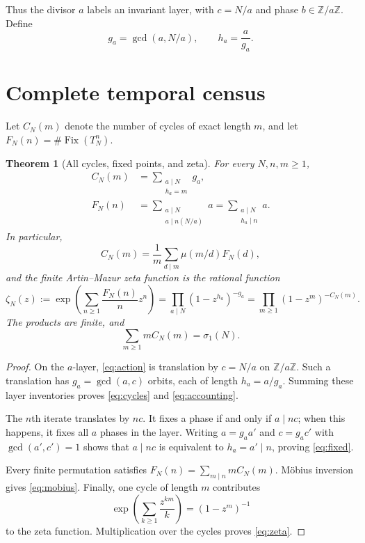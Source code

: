 \documentclass[11pt,a4paper]{amsart}
\newcommand{\Z}{\mathbb Z}
\newcommand{\Fix}{\operatorname{Fix}}
\newtheorem{theorem}{Theorem}[section]
\begin{document}
Thus the divisor $a$ labels an invariant layer, with $c=N/a$ and phase
$b\in\Z/a\Z$.  Define
\begin{equation}
 \label{eq:gh}
 g_a=\gcd(a,N/a),\qquad h_a=\frac{a}{g_a}.
\end{equation}

\section{Complete temporal census}

Let $C_N(m)$ denote the number of cycles of exact length $m$, and let
$F_N(n)=\#\Fix(T_N^n)$.

\begin{theorem}[All cycles, fixed points, and zeta]
\label{thm:census}
For every $N,n,m\geq1$,
\begin{align}
 C_N(m)
   &=\sum_{\substack{a\mid N\\h_a=m}}g_a,                                      \label{eq:cycles}\\
 F_N(n)
   &=\sum_{\substack{a\mid N\\a\mid n(N/a)}}a
     =\sum_{\substack{a\mid N\\h_a\mid n}}a.                                \label{eq:fixed}
\end{align}
In particular,
\begin{equation}
 \label{eq:mobius}
 C_N(m)=\frac1m\sum_{d\mid m}\mu(m/d)F_N(d),
\end{equation}
and the finite Artin--Mazur zeta function is the rational function
\begin{equation}
 \label{eq:zeta}
 \zeta_N(z)
 :=\exp\left(\sum_{n\geq1}\frac{F_N(n)}{n}z^n\right)
 =\prod_{a\mid N}(1-z^{h_a})^{-g_a}
 =\prod_{m\geq1}(1-z^m)^{-C_N(m)}.
\end{equation}
The products are finite, and
\begin{equation}
 \label{eq:accounting}
 \sum_{m\geq1}mC_N(m)=\sigma_1(N).
\end{equation}
\end{theorem}

\begin{proof}
On the $a$-layer, \cref{eq:action} is translation by $c=N/a$ on
$\Z/a\Z$.  Such a translation has $g_a=\gcd(a,c)$ orbits, each of length
$h_a=a/g_a$.  Summing these layer inventories proves \eqref{eq:cycles}
and \eqref{eq:accounting}.

The $n$th iterate translates by $nc$.  It fixes a phase if and only if
$a\mid nc$; when this happens, it fixes all $a$ phases in the layer.
Writing $a=g_aa'$ and $c=g_ac'$ with $\gcd(a',c')=1$ shows that
$a\mid nc$ is equivalent to $h_a=a'\mid n$, proving \eqref{eq:fixed}.

Every finite permutation satisfies
$F_N(n)=\sum_{m\mid n}mC_N(m)$.  M\"obius inversion gives
\eqref{eq:mobius}.  Finally, one cycle of length $m$ contributes
\[
 \exp\left(\sum_{k\geq1}\frac{z^{km}}{k}\right)=(1-z^m)^{-1}
\]
to the zeta function.  Multiplication over the cycles proves
\eqref{eq:zeta}.
\end{proof}
\end{document}
